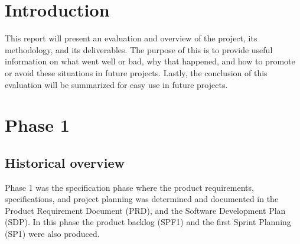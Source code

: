 \documentclass{article}
\begin{document}
\tableofcontents
\newpage


\section{Introduction}
This report will present an evaluation and overview of the project, its methodology, and its deliverables. The purpose of this is to provide useful information on what went well or bad, why that happened, and how to promote or avoid these situations in future projects. Lastly, the conclusion of this evaluation will be summarized for easy use in future projects.

\section{Phase 1}
\subsection{Historical overview}

Phase 1 was the specification phase where the product requirements, specifications, and project planning was determined and documented in the Product Requirement Document (PRD)\cite{PRD}, and the Software Development Plan (SDP)\cite{SDP}. In this phase the product backlog (SPF1)\cite{SPF1} and the first Sprint Planning (SP1)\cite{SP1} were also produced. 
\end{document}
